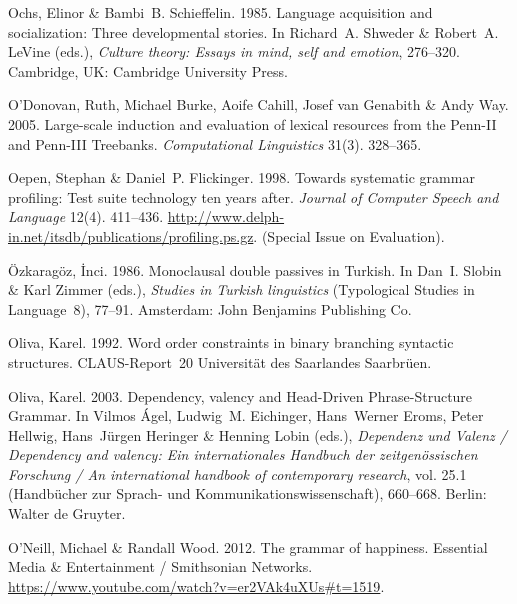 \begin{thebibliography}{1420}
Ochs, Elinor \& Bambi~B. Schieffelin. 1985.
\newblock Language acquisition and socialization: {Three} developmental
  stories.
\newblock In Richard~A. Shweder \& Robert~A. LeVine (eds.), \emph{Culture
  theory: {Essays} in mind, self and emotion}, 276--320. Cambridge, UK:
  Cambridge University Press.

O'Donovan, Ruth, Michael Burke, Aoife Cahill, Josef van Genabith \& Andy Way.
  2005.
\newblock Large-scale induction and evaluation of lexical resources from the
  {Penn-II} and {Penn-III Treebanks}.
\newblock \emph{Computational Linguistics} 31(3). 328--365.

Oepen, Stephan \& Daniel~P. Flickinger. 1998.
\newblock Towards systematic grammar profiling: {Test} suite technology ten
  years after.
\newblock \emph{Journal of Computer Speech and Language} 12(4). 411--436.
\newblock
  \urlprefix\url{http://www.delph-in.net/itsdb/publications/profiling.ps.gz}.
\newblock (Special Issue on Evaluation).

{\"O}zkarag{\"o}z, {\.I}nci. 1986.
\newblock Monoclausal double passives in {Turkish}.
\newblock In Dan~I. Slobin \& Karl Zimmer (eds.), \emph{Studies in {Turkish}
  linguistics} (Typological Studies in Language~8), 77--91. Amsterdam: John
  Benjamins Publishing Co.

Oliva, Karel. 1992.
\newblock Word order constraints in binary branching syntactic structures.
\newblock CLAUS-Re\-port~20 Uni\-ver\-si\-t{\"a}t des Saarlandes
  Saar\-br{\"u}en.

Oliva, Karel. 2003.
\newblock Dependency, valency and {Head-Driven Phrase-Structure Grammar}.
\newblock In Vilmos {\'A}gel, Ludwig~M. Eichinger, Hans~Werner Eroms, Peter
  Hellwig, Hans~J{\"u}rgen Heringer \& Henning Lobin (eds.), \emph{{Dependenz
  und Valenz} / {Dependency} and valency: {Ein internationales Handbuch der
  zeitgen{\"o}ssischen Forschung} / {An} international handbook of contemporary
  research}, vol. 25.1  (Hand\-b{\"u}\-cher zur Sprach- und
  Kommunikationswissenschaft), 660--668. Berlin: Walter de Gruyter.

O'Neill, Michael \& Randall Wood. 2012.
\newblock The grammar of happiness.
\newblock Essential Media \& Entertainment / Smithsonian Networks.
\newblock \urlprefix\url{https://www.youtube.com/watch?v=er2VAk4uXUs#t=1519}.


\end{thebibliography}
